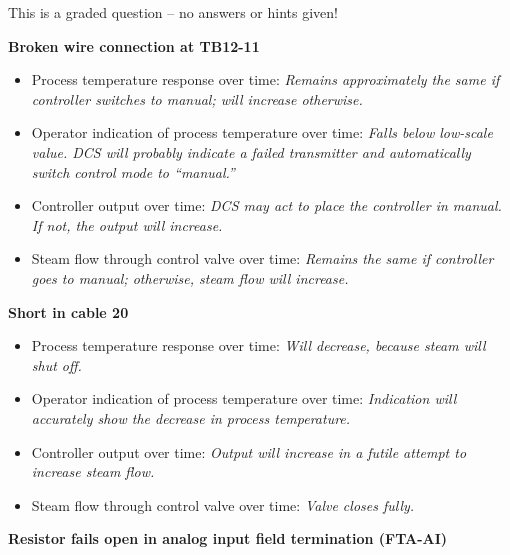 





This is a graded question -- no answers or hints given!







\noindent
{\bf Broken wire connection at TB12-11}

\begin{itemize}
\item{} Process temperature response over time: {\it Remains approximately the same if controller switches to manual; will increase otherwise.}
\vskip 5pt
\item{} Operator indication of process temperature over time: {\it Falls below low-scale value.  DCS will probably indicate a failed transmitter and automatically switch control mode to ``manual.''}
\vskip 5pt
\item{} Controller output over time: {\it DCS may act to place the controller in manual.  If not, the output will increase.}
\vskip 5pt
\item{} Steam flow through control valve over time: {\it Remains the same if controller goes to manual; otherwise, steam flow will increase.}
\end{itemize}

\vskip 10pt

\noindent
{\bf Short in cable 20}

\begin{itemize}
\item{} Process temperature response over time: {\it Will decrease, because steam will shut off.}
\vskip 5pt
\item{} Operator indication of process temperature over time: {\it Indication will accurately show the decrease in process temperature.}
\vskip 5pt
\item{} Controller output over time: {\it Output will increase in a futile attempt to increase steam flow.}
\vskip 5pt
\item{} Steam flow through control valve over time: {\it Valve closes fully.}
\end{itemize}

\vskip 10pt

\noindent
{\bf Resistor fails open in analog input field termination (FTA-AI)}

